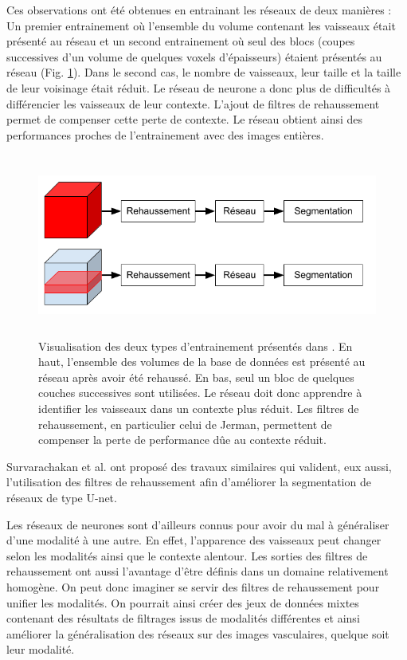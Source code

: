 Ces observations ont été obtenues en entrainant les réseaux de deux manières : Un premier entrainement où l'ensemble du volume contenant les vaisseaux était présenté au réseau et un second entrainement où seul des blocs (coupes successives d'un volume de quelques voxels d'épaisseurs) étaient présentés au réseau (Fig. \ref{fig:full_vs_slab}). Dans le second cas, le nombre de vaisseaux, leur taille et la taille de leur voisinage était réduit. Le réseau de neurone a donc plus de difficultés à différencier les vaisseaux de leur contexte. L'ajout de filtres de rehaussement permet de compenser cette perte de contexte. Le réseau obtient ainsi des performances proches de l'entrainement avec des images entières.

\begin{figure}[!ht]
    \centering
    \includegraphics[height=6cm]{Images/full_vs_slab.png}
    \caption{Visualisation des deux types d'entrainement présentés dans \cite{Affane_2022_article_commun}. En haut, l'ensemble des volumes de la base de données est présenté au réseau après avoir été rehaussé. En bas, seul un bloc de quelques couches successives sont utilisées. Le réseau doit donc apprendre à identifier les vaisseaux dans un contexte plus réduit. Les filtres de rehaussement, en particulier celui de Jerman, permettent de compenser la perte de performance dûe au contexte réduit.}
    \label{fig:full_vs_slab}
  \end{figure}

Survarachakan et al. \cite{Survarachakan2021_deep_vesselness} ont proposé des travaux similaires qui valident, eux aussi, l'utilisation des filtres de rehaussement afin d'améliorer la segmentation de réseaux de type U-net.

Les réseaux de neurones sont d'ailleurs connus pour avoir du mal à généraliser d'une modalité à une autre. En effet, l'apparence des vaisseaux peut changer selon les modalités ainsi que le contexte alentour. Les sorties des filtres de rehaussement ont aussi l'avantage d'être définis dans un domaine relativement homogène. On peut donc imaginer se servir des filtres de rehaussement pour unifier les modalités. On pourrait ainsi créer des jeux de données mixtes contenant des résultats de filtrages issus de modalités différentes et ainsi améliorer la généralisation des réseaux sur des images vasculaires, quelque soit leur modalité.

